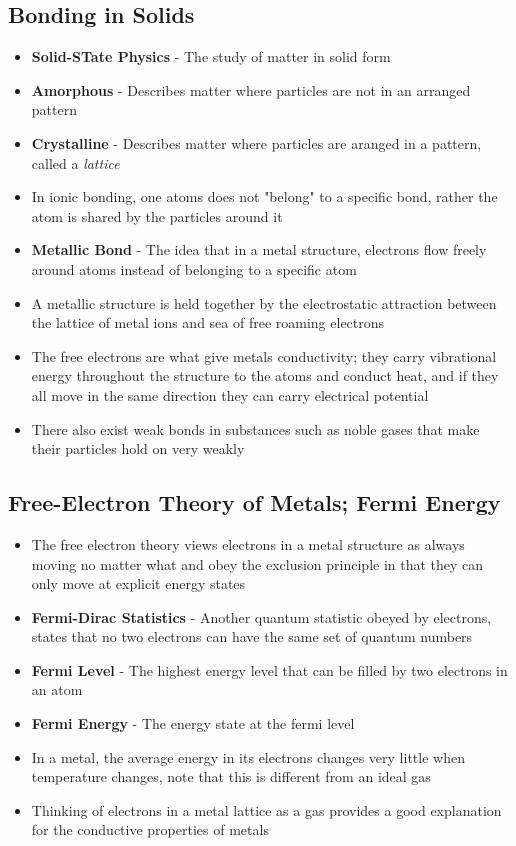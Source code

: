 \subsection{Bonding in Solids}
\begin{itemize}
    \item \textbf{Solid-STate Physics} - The study of matter in solid form
    \item \textbf{Amorphous} - Describes matter where particles are not in an arranged pattern
    \item \textbf{Crystalline} - Describes matter where particles are aranged in a pattern, called a \emph{lattice}
    \item In ionic bonding, one atoms does not "belong" to a specific bond, rather the atom is shared by the particles around it
    \item \textbf{Metallic Bond} - The idea that in a metal structure, electrons flow freely around atoms instead of belonging to a specific atom
    \item A metallic structure is held together by the electrostatic attraction between the lattice of metal ions and sea of free roaming electrons
    \item The free electrons are what give metals conductivity; they carry vibrational energy throughout the structure to the atoms and conduct heat, and if they all move in the same direction they can carry electrical potential
    \item There also exist weak bonds in substances such as noble gases that make their particles hold on very weakly
\end{itemize}

\subsection{Free-Electron Theory of Metals; Fermi Energy}
\begin{itemize}
    \item The free electron theory views electrons in a metal structure as always moving no matter what and obey the exclusion principle in that they can only move at explicit energy states
    \item \textbf{Fermi-Dirac Statistics} - Another quantum statistic obeyed by electrons, states that no two electrons can have the same set of quantum numbers
    \item \textbf{Fermi Level} - The highest energy level that can be filled by two electrons in an atom
    \item \textbf{Fermi Energy} - The energy state at the fermi level
    \item In a metal, the average energy in its electrons changes very little when temperature changes, note that this is different from an ideal gas
    \item Thinking of electrons in a metal lattice as a gas provides a good explanation for the conductive properties of metals
\end{itemize}


